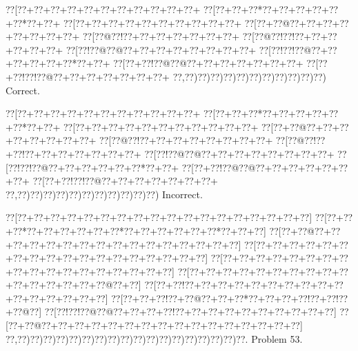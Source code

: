 \documentclass[a5paper]{article}
\begin{document}
\begin{center}
{\goo
\0??[\0??+\0??+\0??+\0??+\0??+\0??+\0??+\0??+\0??+\0??+\0??+
\0??[\0??+\0??+\0??*\0??+\0??+\0??+\0??+\0??+\0??*\0??+\0??+
\0??[\0??+\0??+\0??+\0??+\0??+\0??+\0??+\0??+\0??+\0??+
\0??[\0??+\0??@\0??+\0??+\0??+\0??+\0??+\0??+\0??+\0??+
\0??[\0??@\0??!\0??+\0??+\0??+\0??+\0??+\0??+\0??+
\0??[\0??@\0??!\0??!\0??+\0??+\0??+\0??+\0??+\0??+
\0??[\0??!\0??@\0??@\0??+\0??+\0??+\0??+\0??+\0??+\0??+\0??+
\0??[\0??!\0??!\0??@\0??+\0??+\0??+\0??+\0??+\0??*\0??+\0??+
\0??[\0??+\0??!\0??@\0??@\0??+\0??+\0??+\0??+\0??+\0??+\0??+
\0??[\0??+\0??!\0??!\0??@\0??+\0??+\0??+\0??+\0??+\0??+\0??+
\0??,\0??)\0??)\0??)\0??)\0??)\0??)\0??)\0??)\0??)\0??)\0??)
}
Correct. 

\end{center}
\begin{center}
{\goo
\0??[\0??+\0??+\0??+\0??+\0??+\0??+\0??+\0??+\0??+\0??+\0??+
\0??[\0??+\0??+\0??*\0??+\0??+\0??+\0??+\0??+\0??*\0??+\0??+
\0??[\0??+\0??+\0??+\0??+\0??+\0??+\0??+\0??+\0??+\0??+\0??+
\0??[\0??+\0??@\0??+\0??+\0??+\0??+\0??+\0??+\0??+\0??+
\0??[\0??@\0??!\0??+\0??+\0??+\0??+\0??+\0??+\0??+\0??+
\0??[\0??@\0??!\0??+\0??!\0??+\0??+\0??+\0??+\0??+\0??+\0??+
\0??[\0??!\0??@\0??@\0??+\0??+\0??+\0??+\0??+\0??+\0??+\0??+
\0??[\0??!\0??!\0??@\0??+\0??+\0??+\0??+\0??+\0??*\0??+\0??+
\0??[\0??+\0??!\0??@\0??@\0??+\0??+\0??+\0??+\0??+\0??+\0??+
\0??[\0??+\0??!\0??!\0??@\0??+\0??+\0??+\0??+\0??+\0??+\0??+
\0??,\0??)\0??)\0??)\0??)\0??)\0??)\0??)\0??)\0??)\0??)\0??)
}
Incorrect. 

\end{center}
\newpage
\begin{center}
{\goo
\0??[\0??+\0??+\0??+\0??+\0??+\0??+\0??+\0??+\0??+\0??+\0??+\0??+\0??+\0??+\0??+\0??+\0??+\0??]
\0??[\0??+\0??+\0??*\0??+\0??+\0??+\0??+\0??+\0??*\0??+\0??+\0??+\0??+\0??+\0??*\0??+\0??+\0??]
\0??[\0??+\0??@\0??+\0??+\0??+\0??+\0??+\0??+\0??+\0??+\0??+\0??+\0??+\0??+\0??+\0??+\0??+\0??]
\0??[\0??+\0??+\0??+\0??+\0??+\0??+\0??+\0??+\0??+\0??+\0??+\0??+\0??+\0??+\0??+\0??+\0??+\0??]
\0??[\0??+\0??+\0??+\0??+\0??+\0??+\0??+\0??+\0??+\0??+\0??+\0??+\0??+\0??+\0??+\0??+\0??+\0??]
\0??[\0??+\0??+\0??+\0??+\0??+\0??+\0??+\0??+\0??+\0??+\0??+\0??+\0??+\0??+\0??+\0??@\0??+\0??]
\0??[\0??+\0??!\0??+\0??+\0??+\0??+\0??+\0??+\0??+\0??+\0??+\0??+\0??+\0??+\0??+\0??+\0??+\0??]
\0??[\0??+\0??+\0??!\0??+\0??@\0??+\0??+\0??*\0??+\0??+\0??+\0??!\0??+\0??!\0??+\0??@\0??]
\0??[\0??!\0??!\0??@\0??@\0??+\0??+\0??+\0??!\0??+\0??+\0??+\0??+\0??+\0??+\0??+\0??+\0??+\0??]
\0??[\0??+\0??@\0??+\0??+\0??+\0??+\0??+\0??+\0??+\0??+\0??+\0??+\0??+\0??+\0??+\0??+\0??+\0??]
\0??,\0??)\0??)\0??)\0??)\0??)\0??)\0??)\0??)\0??)\0??)\0??)\0??)\0??)\0??)\0??)\0??)\0??)\0??.
}
Problem 53.

\end{center}
\end{document}
